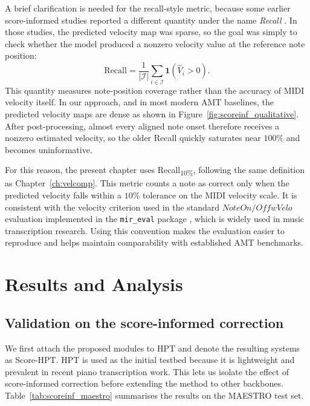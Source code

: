 A brief clarification is needed for the recall-style metric, because some earlier score-informed studies reported a different quantity under the name \emph{Recall} \cite{kim2024method}. In those studies, the predicted velocity map was sparse, so the goal was simply to check whether the model produced a nonzero velocity value at the reference note position:
\begin{equation}
\mathrm{Recall}
= \frac{1}{|\mathcal{I}|}\sum_{i\in\mathcal{I}}
\mathbf{1}\!\left(\hat{V}_i > 0\right).
\label{eq:scoreinf:legacy_recall}
\end{equation}
This quantity measures note-position coverage rather than the accuracy of MIDI velocity itself. In our approach, and in most modern AMT baselines, the predicted velocity maps are dense as shown in Figure~\ref{fig:scoreinf_qualitative}. After post-processing, almost every aligned note onset therefore receives a nonzero estimated velocity, so the older Recall quickly saturates near \(100\%\) and becomes uninformative.

For this reason, the present chapter uses Recall\textsubscript{10\%}, following the same definition as Chapter~\ref{ch:velcomp}. This metric counts a note as correct only when the predicted velocity falls within a $10\%$ tolerance on the MIDI velocity scale. It is consistent with the velocity criterion used in the standard $NoteOn/OffwVelo$ evaluation implemented in the \texttt{mir\_eval} package \cite{raffel2014mireval}, which is widely used in music transcription research. Using this convention makes the evaluation easier to reproduce and helps maintain comparability with established AMT benchmarks.

\section{Results and Analysis}
\label{sec:scoreinf:results}

\subsection{Validation on the score-informed correction}
\label{sec:scoreinf:results:maestro}

We first attach the proposed modules to HPT and denote the resulting systems as Score-HPT. HPT is used as the initial testbed because it is lightweight and prevalent in recent piano transcription work. This lets us isolate the effect of score-informed correction before extending the method to other backbones. Table~\ref{tab:scoreinf_maestro} summarises the results on the MAESTRO test set.

